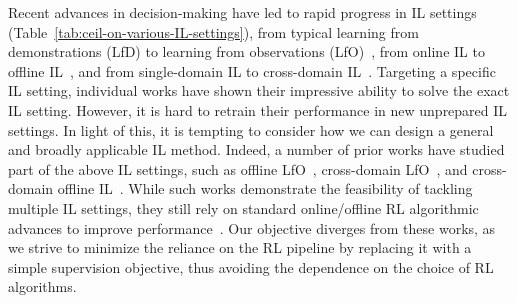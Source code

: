 Recent advances in decision-making have led to rapid progress in IL settings (Table~\ref{tab:ceil-on-various-IL-settings}), from typical learning from demonstrations (LfD) to learning from observations (LfO)~\citep{boborzi2022imitation, brown2020better, judah2014imitation, liu2018imitation, ross2011reduction, torabi2018generative}, from online IL to offline IL~\citep{chang2021mitigating, demoss2023ditto, jarrett2020strictly,  liu2021curriculum,zhang2023discriminator}, and from single-domain IL to cross-domain IL~\citep{jiang2020offline, liu2019state, ma2022smodice, viano2022robust}. 
Targeting a specific IL setting, individual works have shown their impressive ability to solve the exact IL setting. However, it is hard to retrain their performance in new unprepared IL settings. In light of this, it is tempting to consider how we can design a general and broadly applicable IL method. Indeed, a number of prior works have studied part of the above IL settings, such as offline LfO~\citep{zolna2020offline}, cross-domain LfO~\citep{liu2019state, raychaudhuri2021cross}, and cross-domain offline IL~\citep{ma2022smodice}. 
While such works demonstrate the feasibility of tackling multiple IL settings, they still rely on standard online/offline RL algorithmic advances to improve performance~\citep{gangwani2020state, jarboui2021offline, lee2021generalizable, li2017infogail, liu2022dara, liu2023beyond, luo2023optimal, yue2023clare, zhuang2023behavior}. 
Our objective diverges from these works, as we strive to minimize the reliance on the RL pipeline by replacing it with a simple supervision objective, thus avoiding the dependence on the choice of RL algorithms.


